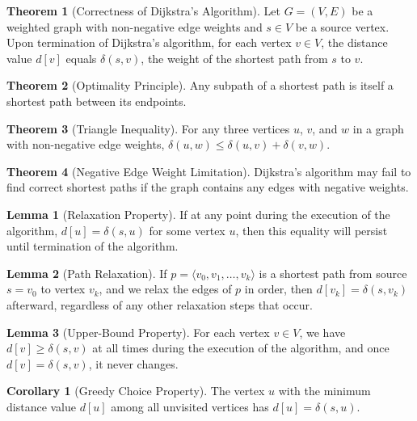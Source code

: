 \documentclass{article}
\theoremstyle{definition}
\newtheorem{theorem}{Theorem}
\newtheorem{lemma}{Lemma}
\newtheorem{corollary}{Corollary}
\begin{document}
\begin{theorem}[Correctness of Dijkstra's Algorithm]
Let $G = (V, E)$ be a weighted graph with non-negative edge weights and $s \in V$ be a source vertex. Upon termination of Dijkstra's algorithm, for each vertex $v \in V$, the distance value $d[v]$ equals $\delta(s, v)$, the weight of the shortest path from $s$ to $v$.
\end{theorem}

\begin{theorem}[Optimality Principle]
Any subpath of a shortest path is itself a shortest path between its endpoints.
\end{theorem}

\begin{theorem}[Triangle Inequality]
For any three vertices $u$, $v$, and $w$ in a graph with non-negative edge weights, $\delta(u,w) \leq \delta(u,v) + \delta(v,w)$.
\end{theorem}

\begin{theorem}[Negative Edge Weight Limitation]
Dijkstra's algorithm may fail to find correct shortest paths if the graph contains any edges with negative weights.
\end{theorem}

\begin{lemma}[Relaxation Property]
If at any point during the execution of the algorithm, $d[u] = \delta(s,u)$ for some vertex $u$, then this equality will persist until termination of the algorithm.
\end{lemma}

\begin{lemma}[Path Relaxation]
If $p = \langle v_0, v_1, \ldots, v_k \rangle$ is a shortest path from source $s = v_0$ to vertex $v_k$, and we relax the edges of $p$ in order, then $d[v_k] = \delta(s, v_k)$ afterward, regardless of any other relaxation steps that occur.
\end{lemma}

\begin{lemma}[Upper-Bound Property]
For each vertex $v \in V$, we have $d[v] \geq \delta(s, v)$ at all times during the execution of the algorithm, and once $d[v] = \delta(s, v)$, it never changes.
\end{lemma}

\begin{corollary}[Greedy Choice Property]
The vertex $u$ with the minimum distance value $d[u]$ among all unvisited vertices has $d[u] = \delta(s, u)$.
\end{corollary}
\end{document}
